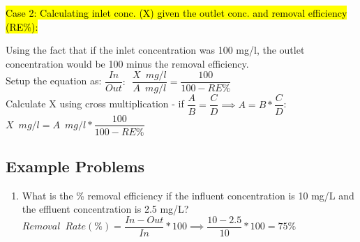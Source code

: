 \documentclass{article}
\begin{document}
\begin{enumerate}
\hl{Case 2:  Calculating inlet conc. (X) given the outlet conc. and removal efficiency (RE\%):}

\begin{figure}[!h]
\centering
{}
\end{figure}
Using the fact that if the inlet concentration was 100 mg/l, the outlet concentration would be 100 minus the removal efficiency.\\
Setup the equation as:  $\dfrac{In}{Out}: \enspace \dfrac{X \enspace mg/l}{A \enspace mg/l}=\dfrac{100}{100-RE\%}$\\
\vspace{0.3cm}
Calculate X using cross multiplication - if $\dfrac{A}{B}=\dfrac{C}{D} \implies A=B*\dfrac{C}{D}$:\\
$X \enspace mg/l=A \enspace mg/l*\dfrac{100}{100-RE\%}$\\

\vspace{0.4cm}
\subsection{Example Problems}

\begin{enumerate}

\item What is the \% removal efficiency if the influent concentration is 10 mg/L and the effluent concentration is 2.5 mg/L?\\
$Removal \enspace Rate (\%) = \dfrac{In-Out}{In}*100 \implies \dfrac{10-2.5}{10}*100=\boxed{75\%}$




\end{enumerate}
\end{enumerate}
\end{document}
